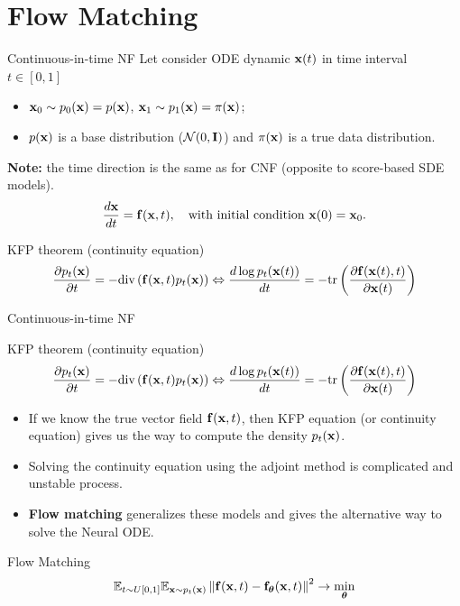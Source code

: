 \section{Flow Matching}
\begin{frame}{Continuous-in-time NF}
	Let consider ODE dynamic $\mathbf{x}(t)$ in time interval $t \in [0, 1]$
	\begin{itemize}
	\item $\mathbf{x}_0 \sim p_0(\mathbf{x}) = p(\mathbf{x})$, $\mathbf{x}_1 \sim p_1(\mathbf{x}) =  \pi(\mathbf{x})$;
	\item $p(\mathbf{x})$ is a base distribution ($\mathcal{N}(0, \mathbf{I})$) and $\pi(\mathbf{x})$ is a true data distribution.
	\end{itemize} 
	\textbf{Note:} the time direction is the same as for CNF (opposite to score-based SDE models).
	\[
		\frac{d \mathbf{x}}{dt} = \mathbf{f} (\mathbf{x}, t),  \quad \text{with initial condition }\mathbf{x}(0) = \mathbf{x}_0.
	\]
	\vspace{-0.3cm}
	\begin{block}{KFP theorem (continuity equation)}
		\vspace{-0.5cm}
		\[
			\frac{\partial p_t(\mathbf{x})}{\partial t} = - \text{div}\left(\mathbf{f}(\mathbf{x}, t) p_t(\mathbf{x})\right) \Leftrightarrow \frac{d \log p_t(\mathbf{x}(t))}{d t} = - \text{tr} \left( \frac{\partial \mathbf{f}(\mathbf{x}(t), t)}{\partial \mathbf{x}(t)} \right)
		\]
		\vspace{-0.3cm}
	\end{block}
\end{frame}
\begin{frame}{Continuous-in-time NF}
	\begin{block}{KFP theorem (continuity equation)}
		\vspace{-0.5cm}
		\[
			\frac{\partial p_t(\mathbf{x})}{\partial t} = - \text{div}\left(\mathbf{f}(\mathbf{x}, t) p_t(\mathbf{x})\right) \Leftrightarrow \frac{d \log p_t(\mathbf{x}(t))}{d t} = - \text{tr} \left( \frac{\partial \mathbf{f}(\mathbf{x}(t), t)}{\partial \mathbf{x}(t)} \right)
		\]
		\vspace{-0.3cm}
	\end{block}
	\begin{itemize}
		\item If we know the true vector field $\mathbf{f} (\mathbf{x}, t)$, then KFP equation (or continuity equation) gives us the way to compute the density $p_t(\mathbf{x})$.
		\item Solving the continuity equation using the adjoint method is complicated and unstable process.
		\item \textbf{Flow matching} generalizes these models and gives the alternative way to solve the Neural ODE.
	\end{itemize}
	\begin{block}{Flow Matching}
		\vspace{-0.3cm}
		\[
			\mathbb{E}_{t \sim U[0, 1]} \mathbb{E}_{\mathbf{x} \sim p_t(\mathbf{x})}\left\| \mathbf{f}(\mathbf{x}, t) - \mathbf{f}_{\boldsymbol{\theta}}(\mathbf{x}, t) \right\|^2 \rightarrow \min_{\boldsymbol{\theta}}
		\]
		\vspace{-0.3cm}
	\end{block}
\end{frame}
